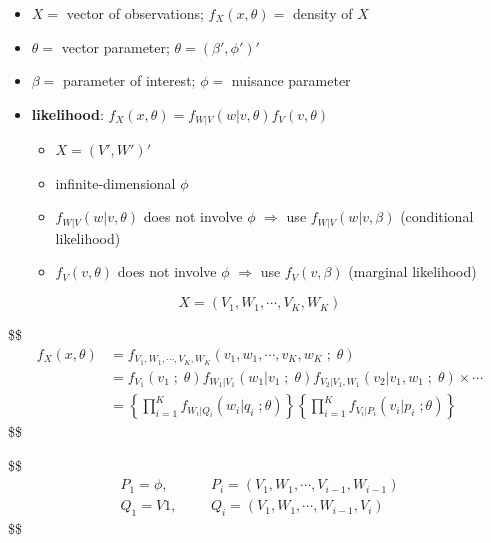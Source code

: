 \documentclass[
]{book}
\providecommand{\tightlist}{%
  \setlength{\itemsep}{0pt}\setlength{\parskip}{0pt}}
\theoremstyle{definition}
\theoremstyle{definition}
\theoremstyle{definition}
\theoremstyle{definition}
\theoremstyle{remark}
\begin{document}
\begin{itemize}
\item
  \(X =\) vector of observations; \(f_X(x, \theta) =\) density of \(X\)
\item
  \(\theta =\) vector parameter; \(\theta = (\beta ' , \phi')'\)
\item
  \(\beta =\) parameter of interest; \(\phi =\) nuisance parameter
\item
  \textbf{likelihood}: \(f_X(x, \theta) = f_{W|V} (w \Big | v, \theta )f_V (v, \theta)\)

  \begin{itemize}
  \tightlist
  \item
    \(X = (V', W')'\)
  \item
    infinite-dimensional \(\phi\)
  \item
    \(f_{W|V} (w \Big | v, \theta )\) does not involve \(\phi\) \(\Rightarrow\) use \(f_{W|V} (w \Big | v, \beta )\) (conditional likelihood)
  \item
    \(f_V (v, \theta)\) does not involve \(\phi\) \(\Rightarrow\) use \(f_V (v, \beta)\) (marginal likelihood)
  \end{itemize}
\end{itemize}

\[
X = (V_1 , W_1 , \cdots, V_K , W_K)
\]

\$\$
\begin{align}


f_X(x, \theta) &= f_{V_1 , W_1 , \cdots, V_K , W_K} (v_1 , w_1 , \cdots, v_K , w_K\; ;\; \theta)
\\

&= 
f_{V_1}(v_1 \; ; \; \theta)

f_{W_1 | V_1}(w_1 | v_1\; ; \; \theta)

f_{V_2 | V_1, W_1}(v_2 |  v_1, w_1\; ; \; \theta) \times \cdots

\\

&= \left \{ \prod_{i=1}^K f_{W_i | Q_i } (w_i \Big | q_i \; ; \theta) \right \}


\left \{ \prod_{i=1}^K f_{V_i | P_i } (v_i \Big | p_i \; ; \theta) \right \}

\end{align}
\$\$

\$\$
\begin{align}


P_1 = \phi,& && P_i =(V_1 , W_1 , \cdots, V_{i-1} , W_{i-1})
\\
Q_1 = V1,& && Q_i =(V_1 , W_1 , \cdots , W_{i-1}, V_i)

\end{align}
\$\$
\end{document}
